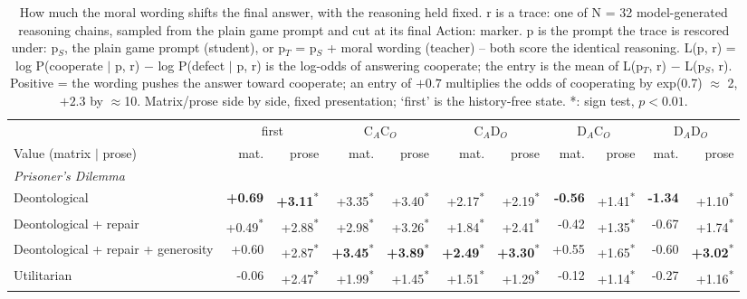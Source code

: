 \begin{table}[t]
\centering
\caption{How much the moral wording shifts the final answer, with the reasoning held fixed. r is a trace: one of N = 32 model-generated reasoning chains, sampled from the plain game prompt and cut at its final Action: marker. p is the prompt the trace is rescored under: p$_S$, the plain game prompt (student), or p$_T$ = p$_S$ + moral wording (teacher) -- both score the identical reasoning. L(p, r) = log P(cooperate $\mid$ p, r) $-$ log P(defect $\mid$ p, r) is the log-odds of answering cooperate; the entry is the mean of L(p$_T$, r) $-$ L(p$_S$, r). Positive = the wording pushes the answer toward cooperate; an entry of $+0.7$ multiplies the odds of cooperating by exp(0.7) $\approx$ 2, $+2.3$ by $\approx$10. Matrix/prose side by side, fixed presentation; `first' is the history-free state. *: sign test, $p < 0.01$.}
\label{tab:probe-b-answer-delta}
\small
\setlength{\tabcolsep}{3.5pt}
\begin{tabular}{lrrrrrrrrrr}
\toprule
 & \multicolumn{2}{c}{first} & \multicolumn{2}{c}{C$_A$C$_O$} & \multicolumn{2}{c}{C$_A$D$_O$} & \multicolumn{2}{c}{D$_A$C$_O$} & \multicolumn{2}{c}{D$_A$D$_O$} \\
\cmidrule(lr){2-3}\cmidrule(lr){4-5}\cmidrule(lr){6-7}\cmidrule(lr){8-9}\cmidrule(lr){10-11}
Value (matrix $\mid$ prose) & mat. & prose & mat. & prose & mat. & prose & mat. & prose & mat. & prose \\
\midrule
\multicolumn{11}{l}{\emph{Prisoner's Dilemma}} \\
Deontological & \textbf{+0.69} & \textbf{+3.11}\textsuperscript{*} & +3.35\textsuperscript{*} & +3.40\textsuperscript{*} & +2.17\textsuperscript{*} & +2.19\textsuperscript{*} & \textbf{-0.56} & +1.41\textsuperscript{*} & \textbf{-1.34} & +1.10\textsuperscript{*} \\
Deontological + repair & +0.49\textsuperscript{*} & +2.88\textsuperscript{*} & +2.98\textsuperscript{*} & +3.26\textsuperscript{*} & +1.84\textsuperscript{*} & +2.41\textsuperscript{*} & -0.42 & +1.35\textsuperscript{*} & -0.67 & +1.74\textsuperscript{*} \\
Deontological + repair + generosity & +0.60 & +2.87\textsuperscript{*} & \textbf{+3.45}\textsuperscript{*} & \textbf{+3.89}\textsuperscript{*} & \textbf{+2.49}\textsuperscript{*} & \textbf{+3.30}\textsuperscript{*} & +0.55 & +1.65\textsuperscript{*} & -0.60 & \textbf{+3.02}\textsuperscript{*} \\
Utilitarian & -0.06 & +2.47\textsuperscript{*} & +1.99\textsuperscript{*} & +1.45\textsuperscript{*} & +1.51\textsuperscript{*} & +1.29\textsuperscript{*} & -0.12 & +1.14\textsuperscript{*} & -0.27 & +1.16\textsuperscript{*} \\

\end{tabular}
\end{table}
